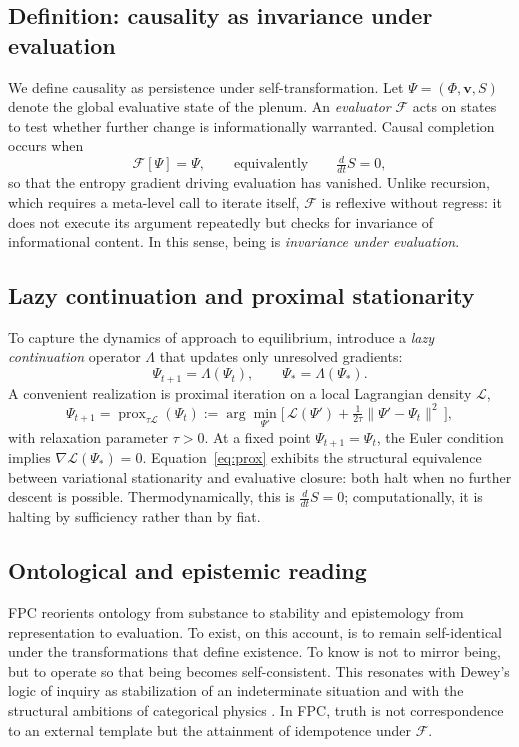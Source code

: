\documentclass[12pt,a4paper]{article}
\newcommand{\Ph}{\Phi}                %
\newcommand{\Vv}{\mathbf{v}}          %
\newcommand{\Ss}{S}                   %
\newcommand{\lag}{\mathcal{L}}        %
\newcommand{\ddt}{\tfrac{d}{dt}}      %
\newcommand{\State}{\Psi}             %
\newcommand{\F}{\mathcal{F}}          %
\newcommand{\LambdaOp}{\Lambda}       %
\theoremstyle{plain}
\begin{document}
\subsection{Definition: causality as invariance under evaluation}
We define causality as persistence under self-transformation. Let \(\State=(\Ph,\Vv,\Ss)\) denote the global evaluative state of the plenum. An \emph{evaluator} \(\F\) acts on states to test whether further change is informationally warranted. Causal completion occurs when
\begin{equation}
\F[\State]=\State,
\qquad\text{equivalently}\qquad
\ddt \Ss=0,
\end{equation}
so that the entropy gradient driving evaluation has vanished. Unlike recursion, which requires a meta-level call to iterate itself, \(\F\) is reflexive without regress: it does not execute its argument repeatedly but checks for invariance of informational content. In this sense, being is \emph{invariance under evaluation}.

\subsection{Lazy continuation and proximal stationarity}
To capture the dynamics of approach to equilibrium, introduce a \emph{lazy continuation} operator \(\LambdaOp\) that updates only unresolved gradients:
\begin{equation}
\label{eq:lazy}
\State_{t+1}=\LambdaOp(\State_t),
\qquad
\State_*=\LambdaOp(\State_*).
\end{equation}
A convenient realization is proximal iteration on a local Lagrangian density \(\lag\),
\begin{equation}
\label{eq:prox}
\State_{t+1}
= \operatorname{prox}_{\tau\lag}(\State_t)
:= \arg\min_{\State'}\Big[\,\lag(\State')+\tfrac{1}{2\tau}\|\State'-\State_t\|^2\,\Big],
\end{equation}
with relaxation parameter \(\tau>0\). At a fixed point \(\State_{t+1}=\State_t\), the Euler condition implies \(\nabla \lag(\State_*)=0\). Equation~\eqref{eq:prox} exhibits the structural equivalence between variational stationarity and evaluative closure: both halt when no further descent is possible. Thermodynamically, this is \(\ddt \Ss=0\); computationally, it is halting by sufficiency rather than by fiat.

\subsection{Ontological and epistemic reading}
FPC reorients ontology from substance to stability and epistemology from representation to evaluation. To exist, on this account, is to remain self-identical under the transformations that define existence. To know is not to mirror being, but to operate so that being becomes self-consistent. This resonates with Dewey’s logic of inquiry as stabilization of an indeterminate situation \citep{dewey1938logic} and with the structural ambitions of categorical physics \citep{baez2011physics}. In FPC, truth is not correspondence to an external template but the attainment of idempotence under \(\F\).
\end{document}
